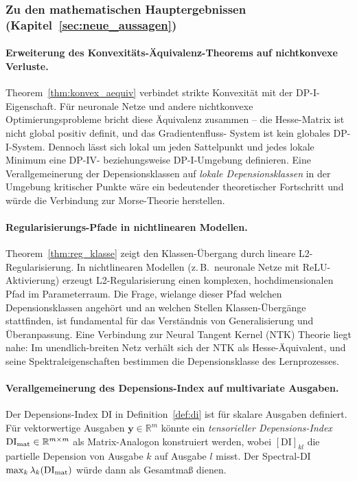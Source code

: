 ﻿\documentclass[12pt, a4paper]{article}
\theoremstyle{definition}
\theoremstyle{remark}
\newcommand{\R}{\mathbb{R}}
\newcommand{\vy}{\bm{y}}
\begin{document}
\subsubsection{Zu den mathematischen Hauptergebnissen (Kapitel~\ref{sec:neue_aussagen})}

\paragraph{Erweiterung des Konvexitäts-Äquivalenz-Theorems auf nichtkonvexe Verluste.}
Theorem~\ref{thm:konvex_aequiv} verbindet strikte Konvexität mit der DP-I-Eigenschaft.
Für neuronale Netze und andere nichtkonvexe Optimierungsprobleme bricht diese Äquivalenz
zusammen -- die Hesse-Matrix ist nicht global positiv definit, und das Gradientenfluss-
System ist kein globales DP-I-System. Dennoch lässt sich lokal um jeden Sattelpunkt
und jedes lokale Minimum eine DP-IV- beziehungsweise DP-I-Umgebung definieren. Eine
Verallgemeinerung der Depensionsklassen auf \emph{lokale Depensionsklassen} in der
Umgebung kritischer Punkte wäre ein bedeutender theoretischer Fortschritt und würde
die Verbindung zur Morse-Theorie herstellen.

\paragraph{Regularisierungs-Pfade in nichtlinearen Modellen.}
Theorem~\ref{thm:reg_klasse} zeigt den Klassen-Übergang durch lineare L2-Regularisierung.
In nichtlinearen Modellen (z.\,B.\ neuronale Netze mit ReLU-Aktivierung) erzeugt
L2-Regularisierung einen komplexen, hochdimensionalen Pfad im Parameterraum. Die
Frage, wielange dieser Pfad welchen Depensionsklassen angehört und an welchen Stellen
Klassen-Übergänge stattfinden, ist fundamental für das Verständnis von
Generalisierung und Überanpassung. Eine Verbindung zur Neural Tangent Kernel (NTK)
Theorie liegt nahe: Im unendlich-breiten Netz verhält sich der NTK als Hesse-Äquivalent,
und seine Spektraleigenschaften bestimmen die Depensionsklasse des Lernprozesses.

\paragraph{Verallgemeinerung des Depensions-Index auf multivariate Ausgaben.}
Der Depensions-Index DI in Definition~\ref{def:di} ist für skalare Ausgaben definiert.
Für vektorwertige Ausgaben $\vy \in \R^m$ könnte ein \emph{tensorieller Depensions-Index}
$\mathrm{DI}_{\rm mat} \in \R^{m \times m}$ als Matrix-Analogon konstruiert werden,
wobei $[\mathrm{DI}]_{kl}$ die partielle Depension von Ausgabe $k$ auf Ausgabe $l$
misst. Der Spectral-DI $\max_k \lambda_k(\mathrm{DI}_{\rm mat})$ würde dann als
Gesamtmaß dienen.
\end{document}
